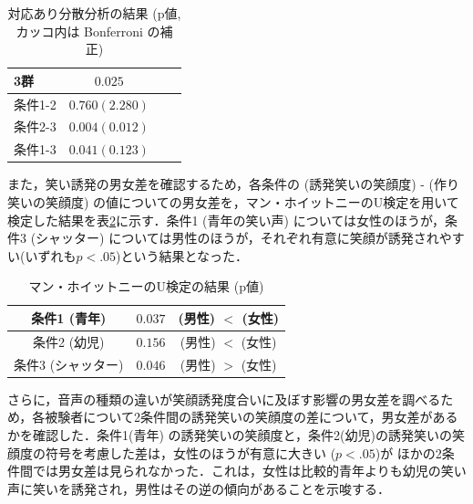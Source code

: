 \documentclass[submit,techreq]{ec2014}
\begin{document}
\begin{table}[htb]
  \begin{center}
    \caption{対応あり分散分析の結果 (p値, カッコ内は Bonferroni の補正)}
    \begin{tabular}{|l|c|r||r|} \hline
      3群 & $0.025$  \\ \hline 
      条件1-2 & $0.760 (2.280)$ \\ \hline
      条件2-3 & $0.004 (0.012)$ \\ \hline
      条件1-3 & $0.041 (0.123)$ \\ \hline
    \end{tabular}
    \label{tab:price}
  \end{center}
\end{table}


また，笑い誘発の男女差を確認するため，各条件の (誘発笑いの笑顔度) - (作り笑いの笑顔度) の値についての男女差を，マン・ホイットニーのU検定を用いて検定した結果を表\ref{manw}に示す．条件1 (青年の笑い声) については女性のほうが，条件3 (シャッター) については男性のほうが，それぞれ有意に笑顔が誘発されやすい(いずれも$p < .05$)という結果となった．

\begin{table}[htb]
  \begin{center}
    \caption{マン・ホイットニーのU検定の結果 (p値)}
    \begin{tabular}{|c|c|c|}  \hline
      条件1 (青年) & $0.037$ & (男性) $<$ (女性) \\ \hline
      条件2 (幼児)  & $0.156$ & (男性) $<$ (女性) \\ \hline
      条件3 (シャッター) & $0.046$ & (男性) $>$ (女性) \\ \hline
    \end{tabular}
    \label{manw}
  \end{center}
\end{table}


さらに，音声の種類の違いが笑顔誘発度合いに及ぼす影響の男女差を調べるため，各被験者について2条件間の誘発笑いの笑顔度の差について，男女差があるかを確認した．条件1(青年) の誘発笑いの笑顔度と，条件2(幼児)の誘発笑いの笑顔度の符号を考慮した差は，女性のほうが有意に大きい ($p < .05$)が
ほかの2条件間では男女差は見られなかった．これは，女性は比較的青年よりも幼児の笑い声に笑いを誘発され，男性はその逆の傾向があることを示唆する．


\end{document}
